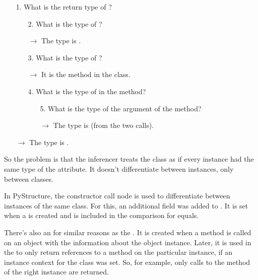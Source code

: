 \documentclass[12pt,halfparskip,DIV11,BCOR10mm]{scrreprt}
\begin{document}
\begin{enumerate}
    \item[1.] What is the return type of ?
    \begin{enumerate}
        \item[2.] What is the type of ?
        \item[] $\rightarrow$ The type is .
        \item[3.] What is the type of ?
        \item[] $\rightarrow$ It is the  method in the  class.
        \item[4.] What is the type of  in the  method?
        \begin{enumerate}
            \item [5.] What is the type of the  argument of the  method?
            \item [] $\rightarrow$ The type is  (from the two  calls).
        \end{enumerate}
    \end{enumerate}
    \item [] $\rightarrow$ The type is .
\end{enumerate}

So the problem is that the inferencer treats the  class as if every instance had the same type of the  attribute. It doesn't differentiate between instances, only between classes.


In PyStructure, the constructor call node is used to differentiate between instances of the same class. For this, an additional field  was added to . It is set when a  is created and is included in the comparison for equals.

There's also an  for similar reasons as the . It is created when a method is called on an object with the information about the object instance. Later, it is used in the  to only return references to a method on the particular instance, if an instance context for the class was set. So, for example, only calls to the  method of the right instance are returned.
\end{document}
